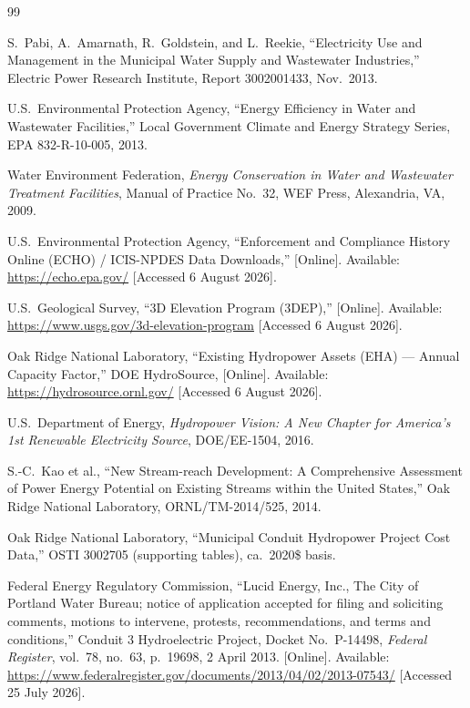 \documentclass[12pt,letterpaper]{report}
\begin{document}
\begin{thebibliography}{99}

S.~Pabi, A.~Amarnath, R.~Goldstein, and L.~Reekie,
``Electricity Use and Management in the Municipal Water Supply and Wastewater Industries,''
Electric Power Research Institute, Report 3002001433, Nov.\ 2013.

U.S.\ Environmental Protection Agency,
``Energy Efficiency in Water and Wastewater Facilities,''
Local Government Climate and Energy Strategy Series, EPA 832-R-10-005, 2013.

Water Environment Federation,
\emph{Energy Conservation in Water and Wastewater Treatment Facilities},
Manual of Practice No.~32, WEF Press, Alexandria, VA, 2009.

U.S.\ Environmental Protection Agency,
``Enforcement and Compliance History Online (ECHO) / ICIS-NPDES Data Downloads,''
[Online]. Available: \url{https://echo.epa.gov/}
[Accessed 6 August 2026].

U.S.\ Geological Survey,
``3D Elevation Program (3DEP),''
[Online]. Available: \url{https://www.usgs.gov/3d-elevation-program}
[Accessed 6 August 2026].

Oak Ridge National Laboratory,
``Existing Hydropower Assets (EHA) --- Annual Capacity Factor,''
DOE HydroSource, [Online]. Available: \url{https://hydrosource.ornl.gov/}
[Accessed 6 August 2026].

U.S.\ Department of Energy,
\emph{Hydropower Vision: A New Chapter for America's 1st Renewable Electricity Source},
DOE/EE-1504, 2016.

S.-C.~Kao et al.,
``New Stream-reach Development: A Comprehensive Assessment of Power Energy Potential on Existing Streams within the United States,''
Oak Ridge National Laboratory, ORNL/TM-2014/525, 2014.

Oak Ridge National Laboratory,
``Municipal Conduit Hydropower Project Cost Data,''
OSTI 3002705 (supporting tables), ca.\ 2020\$ basis.

Federal Energy Regulatory Commission,
``Lucid Energy, Inc., The City of Portland Water Bureau; notice of application accepted for
filing and soliciting comments, motions to intervene, protests, recommendations, and terms
and conditions,'' Conduit 3 Hydroelectric Project, Docket No.\ P-14498,
\emph{Federal Register}, vol.~78, no.~63, p.~19698, 2 April 2013.
[Online]. Available:
\url{https://www.federalregister.gov/documents/2013/04/02/2013-07543/}
[Accessed 25 July 2026].


\end{thebibliography}
\end{document}
